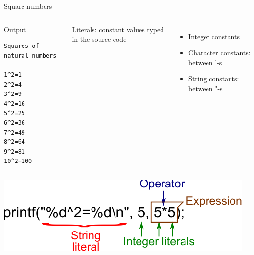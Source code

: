 \documentclass[usenames,dvipsnames,aspectratio=169]{beamer}
\newcommand{\kiemel}[1]{{\color{kiemelesszin}#1}}
\begin{document}
\begin{frame}[fragile]{Square numbers}
  \begin{columns}[c]
      \scriptsize
      \begin{block}{Output}
        \begin{verbatim}
Squares of natural numbers

1^2=1
2^2=4
3^2=9
4^2=16
5^2=25
6^2=36
7^2=49
8^2=64
9^2=81
10^2=100
\end{verbatim}
      \end{block}  
      Literals: constant values typed in the source code
    \begin{itemize}
      \item Integer constants
      \item Character constants: between \kiemel{'}-s
      \item String constants: between \kiemel{"}-s
    \end{itemize}
  \end{columns}
  \begin{center}
    \includegraphics[]{printf1.pdf}
  \end{center}
\end{frame}
\end{document}
